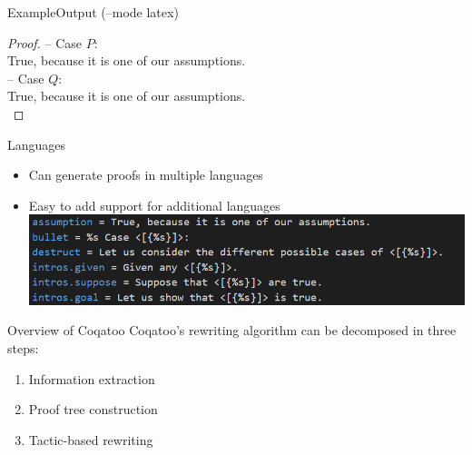 \documentclass[pdf]{beamer}
\begin{document}
\begin{frame}{Example}{Output (--mode latex)}
\begin{proof}
\hspace{5mm}\hspace{5mm}-- Case $P$:\\
\hspace{5mm}\hspace{5mm}\hspace{5mm}True, because it is one of our assumptions.\\
\hspace{5mm}\hspace{5mm}-- Case $Q$:\\
\hspace{5mm}\hspace{5mm}\hspace{5mm}True, because it is one of our assumptions.\\
    \end{proof}
\end{frame}

\begin{frame}{Languages}
    \begin{itemize}
        \item Can generate proofs in multiple languages
        \item Easy to add support for additional languages
        \includegraphics[width=\textwidth]{images/sentences.png}
    \end{itemize}
\end{frame}

\begin{frame}{Overview of Coqatoo}
    Coqatoo's rewriting algorithm can be decomposed in three steps:
    \begin{enumerate}
        \item Information extraction
        \item Proof tree construction
        \item Tactic-based rewriting
    \end{enumerate}
\end{frame}
\end{document}
